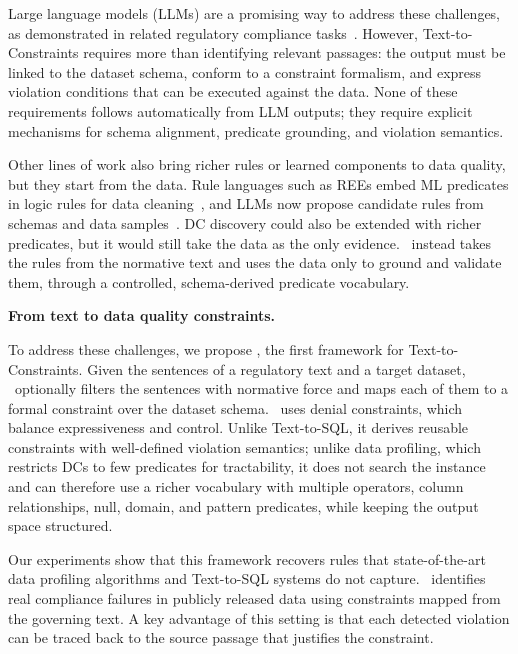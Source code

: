 Large language models (LLMs) are a promising way to address these challenges, as demonstrated in related regulatory compliance tasks~\cite{compliance2025ACMTSEM}. However, Text-to-Constraints requires more than identifying relevant passages: the output must be linked to the dataset schema, conform to a constraint formalism, and express violation conditions that can be executed against the data. None of these requirements follows automatically from LLM outputs; they require explicit mechanisms for schema alignment, predicate grounding, and violation semantics.

Other lines of work also bring richer rules or learned components to data quality, but they start from the data. Rule languages such as REEs embed ML predicates in logic rules for data cleaning~\cite{bao2024rock}, and LLMs now propose candidate rules from schemas and data samples~\cite{biester2024llmclean,glock2026ledqer}. DC discovery could also be extended with richer predicates, but it would still take the data as the only evidence. \system\ instead takes the rules from the normative text and uses the data only to ground and validate them, through a controlled, schema-derived predicate vocabulary.

\smallskip
\noindent\textbf{From text to data quality constraints.}

To address these challenges, we propose \system, the first framework for Text-to-Constraints. Given the sentences of a regulatory text and a target dataset, \system\ optionally filters the sentences with normative force and maps each of them to a formal constraint over the dataset schema. \system\ uses denial constraints, which balance expressiveness and control. Unlike Text-to-SQL, it derives reusable constraints with well-defined violation semantics; unlike data profiling, which restricts DCs to few predicates for tractability, it does not search the instance and can therefore use a richer vocabulary with multiple operators, column relationships, null, domain, and pattern predicates, while keeping the output space structured.

Our experiments show that this framework recovers rules that state-of-the-art data profiling algorithms and Text-to-SQL systems do not capture. \system\ identifies real compliance failures in publicly released data using constraints mapped from the governing text. A key advantage of this setting is that each detected violation can be traced back to the source passage that justifies the constraint.

